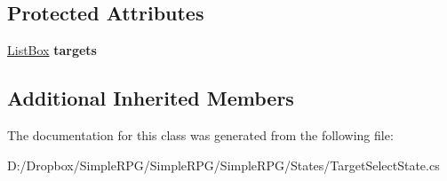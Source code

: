 \subsection*{Protected Attributes}
\begin{DoxyCompactItemize}
\item 
\hypertarget{class_simple_r_p_g_1_1_states_1_1_target_select_state_a83b2a454f571a185bfd77e453bc53c6f}{\hyperlink{class_simple_r_p_g_1_1_windows_1_1_list_box}{List\+Box} {\bfseries targets}}\label{class_simple_r_p_g_1_1_states_1_1_target_select_state_a83b2a454f571a185bfd77e453bc53c6f}

\end{DoxyCompactItemize}
\subsection*{Additional Inherited Members}


The documentation for this class was generated from the following file\+:\begin{DoxyCompactItemize}
\item 
D\+:/\+Dropbox/\+Simple\+R\+P\+G/\+Simple\+R\+P\+G/\+Simple\+R\+P\+G/\+States/Target\+Select\+State.\+cs\end{DoxyCompactItemize}
